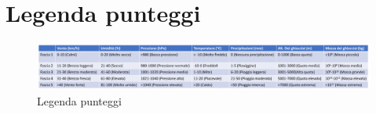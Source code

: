 \section {Legenda punteggi}
\label{sec:legenda_punteggi}
\begin{figure}[H]
    \centering
    \includegraphics[width=1.2\textwidth]{../../img/legenda_punteggi.png}
    \caption{Legenda punteggi}
\end{figure}